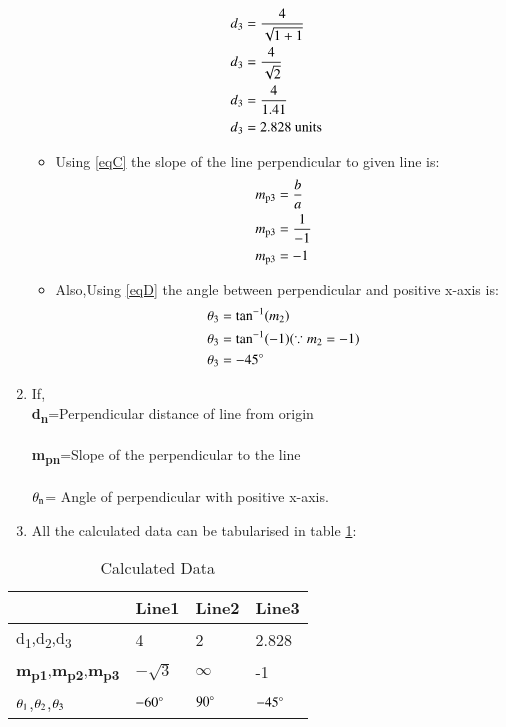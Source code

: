 \documentclass[journal,12pt,twocolumn]{IEEEtran}
\begin{document}
\begin{enumerate}
\begin{itemize}
\begin{align}
\\
d\textsubscript{3}&=\frac{4}{\sqrt{1+1}} 
\\
d\textsubscript{3}&=\frac{4}{\sqrt{2}}
\\
d\textsubscript{3}&=\frac{4}{1.41}
\\
d\textsubscript{3}&=2.828 \text{ units}
\end{align}
\item Using \eqref{eqC} the slope of the line perpendicular to given line is:
\begin{align}
  m\textsubscript{p3}&=\frac{b}{a}
  \\
  m\textsubscript{p3}&=\frac{1}{-1}
  \\
  m\textsubscript{p3}&=-1
\end{align}
 \item Also,Using \eqref{eqD} the angle between perpendicular and positive x-axis is:
 \begin{align}
  \theta\textsubscript{3} &= \tan^{-1}( m\textsubscript{2})
  \\
 \theta\textsubscript{3} &= \tan^{-1}(-1) (\because m\textsubscript{2}=-1)
 \\
 \theta\textsubscript{3} &= -45\degree
\end{align}
\end{itemize}

\item If,
\\
\textbf{d\textsubscript{n}}=Perpendicular distance of line from origin
\\
\\
\textbf{m\textsubscript{pn}}=Slope of the perpendicular to the line 
\\
\\
$\theta\textsubscript{n}$= Angle of perpendicular with positive x-axis.
\\
\item All the calculated data can be tabularised in table  \ref{tab:table2}:
\end{enumerate}
\begin{table}[!ht]
\begin{center}
\begin{tabular}{ | m{2cm} | m{1.2cm}| m{1.2cm} | m{1.2cm} |} 
\hline
 & Line1 & Line2 & Line3 \\
\hline
d\textsubscript{1},d\textsubscript{2},d\textsubscript{3} & 4 & 2 & 2.828 \\ 
\hline
\textbf{m\textsubscript{p1}},\textbf{m\textsubscript{p2}},\textbf{m\textsubscript{p3}} & $-\sqrt{3}$ & $\infty$ & -1 \\ 
\hline
$\theta\textsubscript{1}$,$\theta\textsubscript{2}$,$\theta\textsubscript{3}$& $-60\degree$ & $90\degree$ & $-45\degree$ \\ 
\hline
\end{tabular}
\end{center}
\caption{Calculated Data}
\label{tab:table2}
\end{table}
\end{document}
